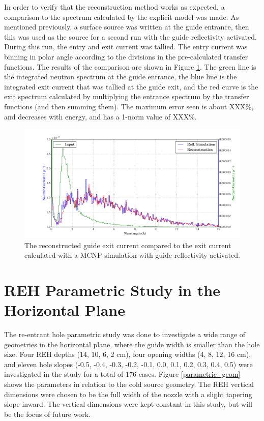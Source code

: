 \documentclass[a4paper]{jpconf}
\begin{document}
In order to verify that the reconstruction method works as expected, a comparison to the spectrum calculated by the explicit model was made.  As mentioned previously, a surface source was written at the guide entrance, then this was used as the source for a second run with the guide reflectivity activated.  During this run, the entry and exit current was tallied.  The entry current was binning in polar angle according to the divisions in the pre-calculated transfer functions.  The results of the comparison are shown in Figure \ref{xfer_bench}.  The green line is the integrated neutron spectrum at the guide entrance, the blue line is the integrated exit current that was tallied at the guide exit, and the red curve is the exit spectrum calculated by multiplying the entrance spectrum by the transfer functions (and then summing them).  The maximum error seen is about XXX\%, and decreases with energy, and has a 1-norm value of XXX\%.

\begin{figure}
\begin{center}
\includegraphics[scale=0.4]{graphics/xfer_bench.pdf}
\end{center}
\caption{\label{xfer_bench}The reconstructed guide exit current compared to the exit current calculated with a MCNP simulation with guide reflectivity activated.}
\end{figure}

\section{REH Parametric Study in the Horizontal Plane}

The re-entrant hole parametric study was done to investigate a wide range of geometries in the horizontal plane, where the guide width is smaller than the hole size.  Four REH depths (14, 10, 6, 2 cm), four opening widths (4, 8, 12, 16 cm), and eleven hole slopes (-0.5, -0.4, -0.3, -0.2, -0.1, 0.0, 0.1, 0.2, 0.3, 0.4, 0.5) were investigated in the study for a total of 176 cases. Figure \ref{parametric_geom} shows the parameters in relation to the cold source geometry.  The REH vertical dimensions were chosen to be the full width of the nozzle with a slight tapering slope inward.  The vertical dimensions were kept constant in this study, but will be the focus of future work.
\end{document}
